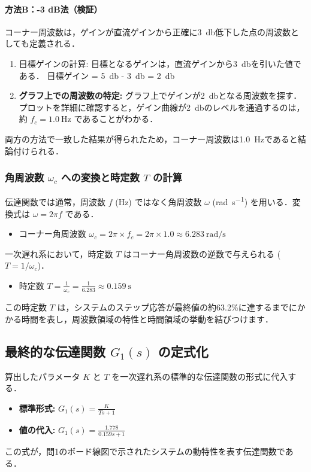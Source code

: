 \documentclass[11pt,a4paper]{ltjsarticle}
\newcommand{\supcite}[1]{\textsuperscript{\cite{#1}}}
\begin{document}
\paragraph{方法B：-3 dB法（検証）}
コーナー周波数は，ゲインが直流ゲインから正確に\SI{3}{\decibel}低下した点の周波数としても定義される\supcite{ref4}．
\begin{enumerate}
    \item 目標ゲインの計算: 目標となるゲインは，直流ゲインから\SI{3}{\decibel}を引いた値である．
    目標ゲイン = \SI{5}{\decibel} - \SI{3}{\decibel} = \SI{2}{\decibel}
    \item \textbf{グラフ上での周波数の特定:} グラフ上でゲインが\SI{2}{\decibel}となる周波数を探す．プロットを詳細に確認すると，ゲイン曲線が\SI{2}{\decibel}のレベルを通過するのは，約 $f_c = \SI{1.0}{\hertz}$ であることがわかる\supcite{ref1}．
\end{enumerate}
両方の方法で一致した結果が得られたため，コーナー周波数は\SI{1.0}{\hertz}であると結論付けられる．

\subsubsection{角周波数 \texorpdfstring{$\omega_c$}{ωc} への変換と時定数 \texorpdfstring{$T$}{T} の計算}

伝達関数では通常，周波数 $f$ (\si{\hertz}) ではなく角周波数 $\omega$ (\si{\radian\per\second}) を用いる．変換式は $\omega = 2\pi f$ である．
\begin{itemize}
    \item コーナー角周波数 $\omega_c = 2\pi \times f_c = 2\pi \times 1.0 \approx \SI{6.283}{\radian\per\second}$
\end{itemize}
一次遅れ系において，時定数 $T$ はコーナー角周波数の逆数で与えられる ($T=1/\omega_c$)\supcite{ref2}．
\begin{itemize}
    \item 時定数 $T = \frac{1}{\omega_c} = \frac{1}{6.283} \approx \SI{0.159}{\second}$
\end{itemize}
この時定数 $T$ は，システムのステップ応答が最終値の約63.2\%に達するまでにかかる時間を表し，周波数領域の特性と時間領域の挙動を結びつけます\supcite{ref5}．

\subsection{最終的な伝達関数 \texorpdfstring{$G_1(s)$}{G1(s)} の定式化}

算出したパラメータ $K$ と $T$ を一次遅れ系の標準的な伝達関数の形式に代入する．
\begin{itemize}
    \item \textbf{標準形式:} $G_1(s) = \frac{K}{Ts+1}$
    \item \textbf{値の代入:}
    $G_1(s) = \frac{1.778}{0.159s+1}$
\end{itemize}
この式が，問1のボード線図で示されたシステムの動特性を表す伝達関数である．
\end{document}
